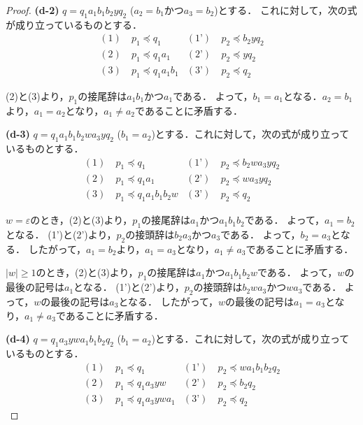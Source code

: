 \begin{proof}
\textbf{(d-2)} $q=q_{1}a_{1}b_{1}b_{2}yq_{2}$ ($a_{2}=b_{1}$かつ$a_{3}=b_{2}$)とする．
これに対して，次の式が成り立っているものとする．
\begin{align*}
(1)~& p_{1} \preceq q_{1} & (\text{1'})~& p_{2} \preceq b_{2}yq_{2} \\
(2)~& p_{1} \preceq q_{1}a_{1} & (\text{2'})~& p_{2} \preceq yq_{2} \\
(3)~& p_{1} \preceq q_{1}a_{1}b_{1} & (\text{3'})~& p_{2} \preceq q_{2}
\end{align*}

(2)と(3)より，$p_{1}$の接尾辞は$a_{1}b_{1}$かつ$a_{1}$である．
よって，$b_{1}=a_{1}$となる．$a_{2}=b_{1}$より，$a_{1}=a_{2}$となり，$a_{1} \ne a_{2}$であることに矛盾する．
\smallskip

\textbf{(d-3)} $q=q_{1}a_{1}b_{1}b_{2}wa_{3}yq_{2}$ ($b_{1}=a_{2}$)とする．これに対して，次の式が成り立っているものとする．
\begin{align*}
(1)~& p_{1} \preceq q_{1} & (\text{1'})~& p_{2} \preceq b_{2}wa_{3}yq_{2} \\
(2)~& p_{1} \preceq q_{1}a_{1} & (\text{2'})~& p_{2} \preceq wa_{3}yq_{2} \\
(3)~& p_{1} \preceq q_{1}a_{1}b_{1}b_{2}w & (\text{3'})~& p_{2} \preceq q_{2}
\end{align*}

$w=\varepsilon$のとき，(2)と(3)より，$p_{1}$の接尾辞は$a_{1}$かつ$a_{1}b_{1}b_{2}$である．
よって，$a_{1}=b_{2}$となる．
(1')と(2')より，$p_{2}$の接頭辞は$b_{2}a_{3}$かつ$a_{3}$である．
よって，$b_{2}=a_{3}$となる．
したがって，$a_{1}=b_{2}$より，$a_{1}=a_{3}$となり，$a_{1} \ne a_{3}$であることに矛盾する．

$|w| \ge 1$のとき，(2)と(3)より，$p_{1}$の接尾辞は$a_{1}$かつ$a_{1}b_{1}b_{2}w$である．
よって，$w$の最後の記号は$a_{1}$となる．
(1')と(2')より，$p_{2}$の接頭辞は$b_{2}wa_{3}$かつ$wa_{3}$である．
よって，$w$の最後の記号は$a_{3}$となる．
したがって，$w$の最後の記号は$a_{1}=a_{3}$となり，$a_{1} \ne a_{3}$であることに矛盾する．
\smallskip

\textbf{(d-4)} $q=q_{1}a_{3}ywa_{1}b_{1}b_{2}q_{2}$ ($b_{1}=a_{2}$)とする．これに対して，次の式が成り立っているものとする．
\begin{align*}
(1)~& p_{1} \preceq q_{1} & (\text{1'})~& p_{2} \preceq wa_{1}b_{1}b_{2}q_{2} \\
(2)~& p_{1} \preceq q_{1}a_{3}yw & (\text{2'})~& p_{2} \preceq b_{2}q_{2} \\
(3)~& p_{1} \preceq q_{1}a_{3}ywa_{1} & (\text{3'})~& p_{2} \preceq q_{2}
\end{align*}


\end{proof}
